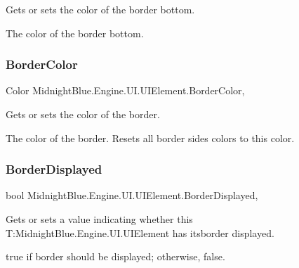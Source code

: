 Gets or sets the color of the border bottom. 

The color of the border bottom.\hypertarget{class_midnight_blue_1_1_engine_1_1_u_i_1_1_u_i_element_a9a743302f1b3978328c85ecae3f6adcb}{}\label{class_midnight_blue_1_1_engine_1_1_u_i_1_1_u_i_element_a9a743302f1b3978328c85ecae3f6adcb} 
\subsubsection{\texorpdfstring{Border\+Color}{BorderColor}}
{\footnotesize\ttfamily Color Midnight\+Blue.\+Engine.\+U\+I.\+U\+I\+Element.\+Border\+Color\hspace{0.3cm}{\ttfamily [get]}, {\ttfamily [set]}}



Gets or sets the color of the border. 

The color of the border. Resets all border sides\textquotesingle{} colors to this color.\hypertarget{class_midnight_blue_1_1_engine_1_1_u_i_1_1_u_i_element_a8631ee4e0cc1d664fdc086364a296ad2}{}\label{class_midnight_blue_1_1_engine_1_1_u_i_1_1_u_i_element_a8631ee4e0cc1d664fdc086364a296ad2} 
\subsubsection{\texorpdfstring{Border\+Displayed}{BorderDisplayed}}
{\footnotesize\ttfamily bool Midnight\+Blue.\+Engine.\+U\+I.\+U\+I\+Element.\+Border\+Displayed\hspace{0.3cm}{\ttfamily [get]}, {\ttfamily [set]}}



Gets or sets a value indicating whether this T\+:\+Midnight\+Blue.\+Engine.\+U\+I.\+U\+I\+Element has itsborder displayed. 

{\ttfamily true} if border should be displayed; otherwise, {\ttfamily false}.\hypertarget{class_midnight_blue_1_1_engine_1_1_u_i_1_1_u_i_element_a5bc05ca69b1d8678de07a8fa6c903c7a}{}\label{class_midnight_blue_1_1_engine_1_1_u_i_1_1_u_i_element_a5bc05ca69b1d8678de07a8fa6c903c7a} 
